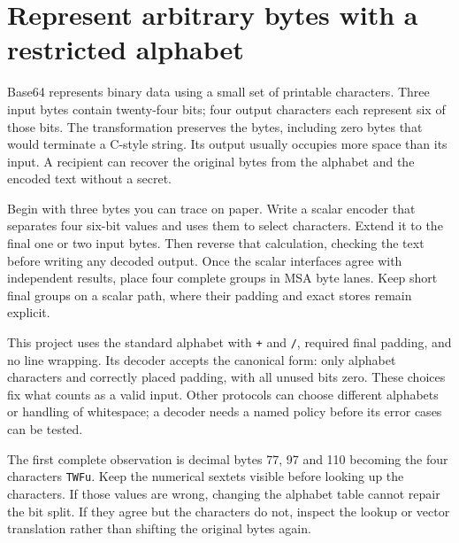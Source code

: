 \section{Represent arbitrary bytes with a restricted alphabet}
Base64 represents binary data using a small set of printable characters. Three input
bytes contain twenty-four bits; four output characters each represent six of those
bits. The transformation preserves the bytes, including zero bytes that would terminate
a C-style string. Its output usually occupies more space than its input. A recipient
can recover the original bytes from the alphabet and the encoded text without a secret.

Begin with three bytes you can trace on paper. Write a scalar encoder that separates
four six-bit values and uses them to select characters. Extend it to the final one or
two input bytes. Then reverse that calculation, checking the text before writing any
decoded output. Once the scalar interfaces agree with independent results, place four
complete groups in MSA byte lanes. Keep short final groups on a scalar path, where their
padding and exact stores remain explicit.

This project uses the standard alphabet with \texttt{+} and \texttt{/}, required final
padding, and no line wrapping. Its decoder accepts the canonical form: only alphabet
characters and correctly placed padding, with all unused bits zero. These choices fix
what counts as a valid input. Other protocols can choose different alphabets or handling
of whitespace; a decoder needs a named policy before its error cases can be tested.

The first complete observation is decimal bytes 77, 97 and 110 becoming the four
characters \texttt{TWFu}. Keep the numerical sextets visible before looking up the
characters. If those values are wrong, changing the alphabet table cannot repair the
bit split. If they agree but the characters do not, inspect the lookup or vector
translation rather than shifting the original bytes again.
